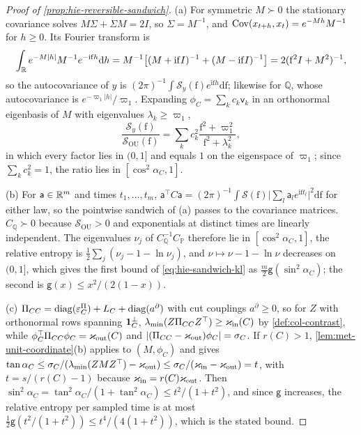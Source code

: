 \begin{proof}[Proof of \cref{prop:hie-reversible-sandwich}]
(a) For symmetric $M\succ0$ the stationary covariance solves $M\Sigma+\Sigma M=2I$, so $\Sigma=M^{-1}$, and $\operatorname{Cov}(x_{t+h},x_t)=e^{-Mh}M^{-1}$ for $h\ge0$. Its Fourier transform is
\[
\int_{\mathbb{R}}e^{-M\lvert h\rvert}M^{-1}e^{-\mathrm i\mathrm fh}\mathrm dh=M^{-1}\bigl[(M+\mathrm i\mathrm fI)^{-1}+(M-\mathrm i\mathrm fI)^{-1}\bigr]=2(\mathrm f^2I+M^2)^{-1},
\]
so the autocovariance of $y$ is $(2\pi)^{-1}\int\mathcal S_y(\mathrm f)e^{\mathrm i\mathrm fh}\mathrm d\mathrm f$; likewise for $\mathbb Q$, whose autocovariance is $e^{-\varpi_1\lvert h\rvert}/\varpi_1$. Expanding $\phi_C=\sum_kc_k\mathsf v_k$ in an orthonormal eigenbasis of $M$ with eigenvalues $\lambda_k\ge\varpi_1$,
\[
\frac{\mathcal S_y(\mathrm f)}{\mathcal S_{\mathrm{OU}}(\mathrm f)}=\sum_kc_k^2\frac{\mathrm f^2+\varpi_1^2}{\mathrm f^2+\lambda_k^2},
\]
in which every factor lies in $(0,1]$ and equals $1$ on the eigenspace of $\varpi_1$; since $\sum_kc_k^2=1$, the ratio lies in $[\cos^2\alpha_C,1]$.

(b) For $\mathsf a\in\mathbb{R}^m$ and times $t_1,\dots,t_m$, $\mathsf a^\top C\mathsf a=(2\pi)^{-1}\int\mathcal S(\mathrm f)\lvert\sum_l\mathsf a_le^{\mathrm i\mathrm ft_l}\rvert^2\mathrm d\mathrm f$ for either law, so the pointwise sandwich of (a) passes to the covariance matrices. $C_{\mathbb Q}\succ0$ because $\mathcal S_{\mathrm{OU}}>0$ and exponentials at distinct times are linearly independent. The eigenvalues $\nu_j$ of $C_{\mathbb Q}^{-1}C_{\mathbb P}$ therefore lie in $[\cos^2\alpha_C,1]$, the relative entropy is $\frac12\sum_j(\nu_j-1-\ln\nu_j)$, and $\nu\mapsto\nu-1-\ln\nu$ decreases on $(0,1]$, which gives the first bound of \eqref{eq:hie-sandwich-kl} as $\frac m2\mathsf g(\sin^2\alpha_C)$; the second is $\mathsf g(x)\le x^2/(2(1-x))$.

(c) $\Pi_{CC}=\operatorname{diag}(\varepsilon^\Pi_C)+L_C+\operatorname{diag}(a^\partial)$ with cut couplings $a^\partial\ge0$, so for $Z$ with orthonormal rows spanning $\mathbf{1}_C^\perp$, $\lambda_{\min}(Z\Pi_{CC}Z^\top)\ge\varkappa_{\mathrm{in}}(C)$ by \cref{def:col-contrast}, while $\phi_C^\top\Pi_{CC}\phi_C=\varkappa_{\mathrm{out}}(C)$ and $\lvert(\Pi_{CC}-\varkappa_{\mathrm{out}})\phi_C\rvert=\sigma_C$. If $r(C)>1$, \cref{lem:met-unit-coordinate}(b) applies to $(M,\phi_C)$ and gives $\tan\alpha_C\le\sigma_C/(\lambda_{\min}(ZMZ^\top)-\varkappa_{\mathrm{out}})\le\sigma_C/(\varkappa_{\mathrm{in}}-\varkappa_{\mathrm{out}})=t$, with $t=s/(r(C)-1)$ because $\varkappa_{\mathrm{in}}=r(C)\varkappa_{\mathrm{out}}$. Then $\sin^2\alpha_C=\tan^2\alpha_C/(1+\tan^2\alpha_C)\le t^2/(1+t^2)$, and since $\mathsf g$ increases, the relative entropy per sampled time is at most $\frac12\mathsf g(t^2/(1+t^2))\le t^4/(4(1+t^2))$, which is the stated bound.
\end{proof}

